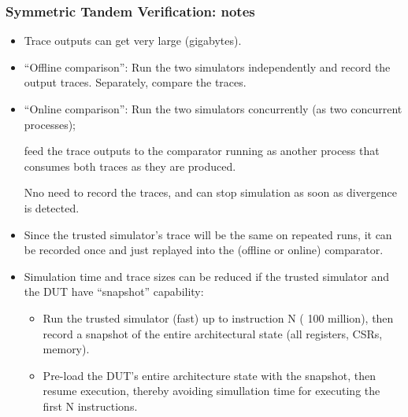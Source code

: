 \begin{frame}[fragile]
\frametitle{Symmetric Tandem Verification: notes}

\footnotesize

\begin{itemize}
  \item Trace outputs can get very large (gigabytes).

  \item ``Offline comparison'': Run the two simulators independently
      and record the output traces.  Separately, compare the traces.

  \item ``Online comparison'': Run the two simulators concurrently (as
      two concurrent processes);

      feed the trace outputs to the comparator running as another
      process that consumes both traces as they are produced.

      Nno need to record the traces, and can stop simulation as soon
      as divergence is detected.

  \item Since the trusted simulator's trace will be the same on
      repeated runs, it can be recorded once and just replayed into
      the (offline or online) comparator.

  \PAUSE{\vxx}

  \item Simulation time and trace sizes can be reduced if the trusted
     simulator and the DUT have ``snapshot'' capability:

     \begin{itemize}\scriptsize

       \item Run the trusted simulator (fast) up to instruction N
         ({\eg} 100 million), then record a snapshot of the entire
         architectural state (all registers, CSRs, memory).

       \item Pre-load the DUT's entire architecture state with the
         snapshot, then resume execution, thereby avoiding simullation
         time for executing the first N instructions.

     \end{itemize}

\end{itemize}

\end{frame}


